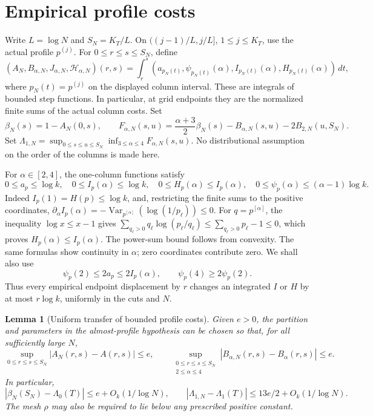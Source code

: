 \documentclass[11pt]{article}
\numberwithin{equation}{section}
\newtheorem{lemma}[lemma]{Lemma}
\newcommand{\1}{\mathbf 1}
\begin{document}
\section{Empirical profile costs}

Write $L=\log N$ and $S_N=K_T/L$.  On
$((j-1)/L,j/L]$, $1\le j\le K_T$, use the actual profile $p^{(j)}$.
For $0\le r\le s\le S_N$, define
\[
 (A_N,B_{\alpha,N},J_{\alpha,N},\mathcal H_{\alpha,N})(r,s)
 =\int_r^s(a_{p_N(t)},\psi_{p_N(t)}(\alpha),
                 I_{p_N(t)}(\alpha),H_{p_N(t)}(\alpha))\,dt,
\]
where $p_N(t)=p^{(j)}$ on the displayed column interval.
These are integrals of bounded step functions.  In particular, at grid
endpoints they are the normalized finite sums of the actual column costs.
Set
\[
 \beta_N(s)=1-A_N(0,s),\qquad
 F_{\alpha,N}(s,u)=\frac{\alpha+3}{2}\beta_N(s)
                 -B_{\alpha,N}(s,u)-2B_{2,N}(u,S_N).
\]
Set $\Lambda_{1,N}=\sup_{0\le s\le u\le S_N}
\inf_{3\le\alpha\le4}F_{\alpha,N}(s,u)$.
No distributional assumption on the order of the columns is made here.

For $\alpha\in[2,4]$, the one-column functions satisfy
\begin{equation}\label{eq:repair-global-one-column-bounds}
 0\le a_p\le\log k,\quad
 0\le I_p(\alpha)\le\log k,\quad
 0\le H_p(\alpha)\le I_p(\alpha),\quad
 0\le\psi_p(\alpha)\le(\alpha-1)\log k.
\end{equation}
Indeed $I_p(1)=H(p)\le\log k$, and, restricting the finite sums to the
positive coordinates,
$\partial_\alpha I_p(\alpha)=-\operatorname{Var}_{p^{[\alpha]}}
(\log(1/p_\ell))\le0$.  For $q=p^{[\alpha]}$, the inequality $\log x\le x-1$ gives
$\sum_{q_\ell>0}q_\ell\log(p_\ell/q_\ell)\le
\sum_{q_\ell>0}p_\ell-1\le0$, which proves $H_p(\alpha)\le I_p(\alpha)$.  The power-sum bound follows from convexity.
The same formulas show continuity in $\alpha$; zero coordinates contribute
zero.  We shall also use
\begin{equation}\label{eq:repair-two-comparisons}
 \psi_p(2)\le2a_p\le2I_p(\alpha),\qquad
 \psi_p(4)\ge2\psi_p(2).
\end{equation}
Thus every empirical endpoint displacement by $r$ changes an integrated
$I$ or $H$ by at most $r\log k$, uniformly in the cuts and $N$.


\begin{lemma}[Uniform transfer of bounded profile costs]
\label{lem:lower-profile-transfer}
Given $e>0$, the partition and parameters in the almost-profile hypothesis
can be chosen so that, for all sufficiently large $N$,
\begin{equation}
\label{eq:lower-profile-transfer}
 \sup_{0\le r\le s\le S_N}|A_N(r,s)-A(r,s)|\le e,\qquad
 \sup_{\substack{0\le r\le s\le S_N\\2\le\alpha\le4}}
 |B_{\alpha,N}(r,s)-B_\alpha(r,s)|\le e.
\end{equation}
In particular,
\begin{equation}
\label{eq:lower-margin-transfer}
 |\beta_N(S_N)-\Lambda_0(T)|\le e+O_k(1/\log N),\qquad
 |\Lambda_{1,N}-\Lambda_1(T)|\le13e/2+O_k(1/\log N).
\end{equation}
The mesh $\rho$ may also be required to lie below any prescribed positive
constant.
\end{lemma}
\end{document}
